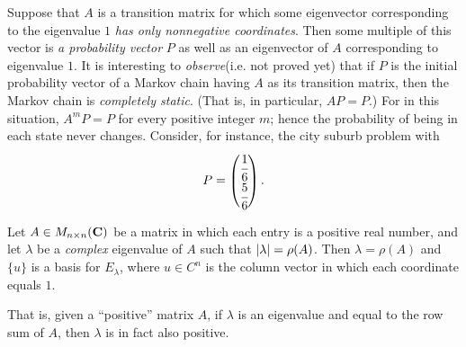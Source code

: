 Suppose that \(A\) is a transition matrix for which some eigenvector corresponding to the eigenvalue \(1\) \emph{has only nonnegative coordinates}.
Then some multiple of this vector is \emph{a probability vector} \(P\) as well as an eigenvector of \(A\) corresponding to eigenvalue \(1\).
It is interesting to \emph{observe}(i.e. not proved yet) that if \(P\) is the initial probability vector of a Markov chain having \(A\) as its transition matrix, then the Markov chain is \emph{completely static}.
(That is, in particular, \(AP = P\).)
For in this situation, \(A^m P = P\) for every positive integer \(m\); hence the probability of being in each state never
changes.
Consider, for instance, the city suburb problem with
\[
    P = \begin{pmatrix} \cfrac{1}{6} \\ \cfrac{5}{6} \end{pmatrix}.
\]

\begin{theorem} \label{thm 5.17}
Let \(A \in M_{n \times n}(\mathbf{C})\) be a matrix in which each entry is a positive real number, and let \(\lambda\) be a \emph{complex} eigenvalue of \(A\) such that \(\lvert\lambda\rvert = \rho(A)\).
Then \(\lambda = \rho(A)\) and \(\{ u \}\) is a basis for \(E_{\lambda}\), where \(u \in C^n\) is the column vector in which each coordinate equals \(1\).
\end{theorem}

\begin{note}
That is, given a ``positive'' matrix \(A\), if \(\lambda\) is an eigenvalue and equal to the row sum of \(A\), then \(\lambda\) is in fact also positive.
\end{note}

